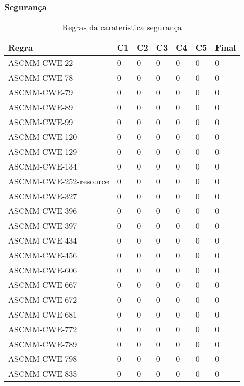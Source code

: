 \documentclass[openany,10pt,a4paper]{article}
\begin{document}
\subsubsection{Segurança}

\begin{samepage}
\begin{longtable}{p{1.3in}|p{0.28in}|p{0.28in}|p{0.28in}|p{0.28in}|p{0.28in}|p{0.35in}}
		\caption{Regras da caraterística segurança}
		\label{variability_impl_mech}
		\endhead
		\hline	
		\textbf{Regra} & \textbf{C1} & \textbf{C2} & \textbf{C3} & \textbf{C4} & \textbf{C5} & \textbf{Final} \\ \hline
		ASCMM-CWE-22 & 0 & 0 & 0 & 0 & 0 & 0 \\ \hline
		ASCMM-CWE-78 & 0 & 0 & 0 & 0 & 0 & 0 \\ \hline
		ASCMM-CWE-79 & 0 & 0 & 0 & 0 & 0 & 0 \\ \hline
		ASCMM-CWE-89 & 0 & 0 & 0 & 0 & 0 & 0 \\ \hline
		ASCMM-CWE-99 & 0 & 0 & 0 & 0 & 0 & 0 \\ \hline
		ASCMM-CWE-120 & 0 & 0 & 0 & 0 & 0 & 0 \\ \hline
		ASCMM-CWE-129 & 0 & 0 & 0 & 0 & 0 & 0 \\ \hline
		ASCMM-CWE-134 & 0 & 0 & 0 & 0 & 0 & 0 \\ \hline
		ASCMM-CWE-252-resource & 0 & 0 & 0 & 0 & 0 & 0 \\ \hline
		ASCMM-CWE-327 & 0 & 0 & 0 & 0 & 0 & 0 \\ \hline
		ASCMM-CWE-396 & 0 & 0 & 0 & 0 & 0 & 0 \\ \hline
		ASCMM-CWE-397 & 0 & 0 & 0 & 0 & 0 & 0 \\ \hline
		ASCMM-CWE-434 & 0 & 0 & 0 & 0 & 0 & 0 \\ \hline
		ASCMM-CWE-456 & 0 & 0 & 0 & 0 & 0 & 0 \\ \hline
		ASCMM-CWE-606 & 0 & 0 & 0 & 0 & 0 & 0 \\ \hline
		ASCMM-CWE-667 & 0 & 0 & 0 & 0 & 0 & 0 \\ \hline
		ASCMM-CWE-672 & 0 & 0 & 0 & 0 & 0 & 0 \\ \hline
		ASCMM-CWE-681 & 0 & 0 & 0 & 0 & 0 & 0 \\ \hline
		ASCMM-CWE-772 & 0 & 0 & 0 & 0 & 0 & 0 \\ \hline
		ASCMM-CWE-789 & 0 & 0 & 0 & 0 & 0 & 0 \\ \hline
		ASCMM-CWE-798 & 0 & 0 & 0 & 0 & 0 & 0 \\ \hline
		ASCMM-CWE-835 & 0 & 0 & 0 & 0 & 0 & 0 \\ \hline
\end{longtable}
\end{samepage}
\end{document}
